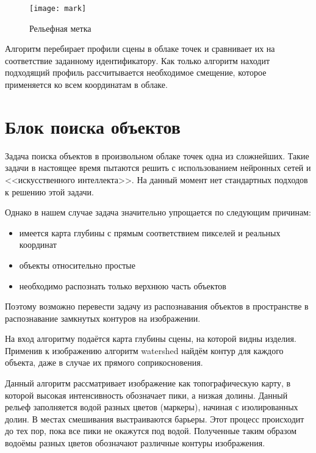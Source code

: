             \begin{figure}[H]
                \centering
                \texttt{[image: mark]}
                \caption{Рельефная метка}
                \label{pic:mark}
            \end{figure}
            
            Алгоритм перебирает профили сцены в облаке точек и сравнивает их на соответствие заданному идентификатору. Как только алгоритм находит подходящий профиль рассчитывается необходимое смещение, которое применяется ко всем координатам в облаке.
            
    \section{Блок поиска объектов}
        Задача поиска объектов в произвольном облаке точек одна из сложнейших. Такие задачи в настоящее время пытаются решить с использованием нейронных сетей и <<искусственного интеллекта>>. На данный момент нет стандартных подходов к решению этой задачи.
        
        Однако в нашем случае задача значительно упрощается по следующим причинам:
        \begin{itemize}
            \item имеется карта глубины с прямым соответствием пикселей и реальных координат
            \item объекты относительно простые
            \item необходимо распознать только верхнюю часть объектов
        \end{itemize}
        Поэтому возможно перевести задачу из распознавания объектов в пространстве в распознавание замкнутых контуров на изображении.
        
        На вход алгоритму подаётся карта глубины сцены, на которой видны изделия. Применив к изображению алгоритм watershed найдём контур для каждого объекта, даже в случае их прямого соприкосновения. 
        
        Данный алгоритм рассматривает изображение как топографическую карту, в которой высокая интенсивность обозначает пики, а низкая долины. Данный рельеф заполняется водой разных цветов (маркеры), начиная с изолированных долин. В местах смешивания выстраиваются барьеры. Этот процесс происходит до тех пор, пока все пики не окажутся под водой. Полученные таким образом водоёмы разных цветов обозначают различные контуры изображения\cite{opencvWATERSHED}.
        

